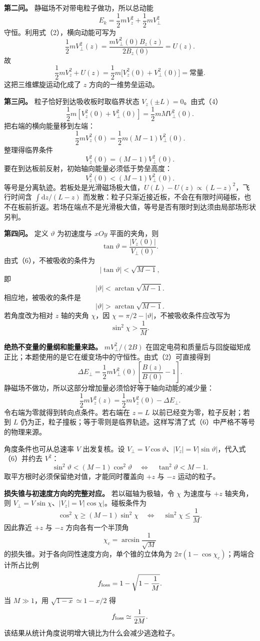\documentclass[12pt,a4paper,UTF8]{ctexart}
\begin{document}
\textbf{第二问。} 静磁场不对带电粒子做功，所以总动能 \[
E_k=\frac12mV_z^2+\frac12mV_\perp^2
\] 守恒。利用式（2），横向动能可写为 \[
\frac12mV_\perp^2(z)
=\frac{mV_\perp^2(0)B_z(z)}{2B_z(0)}
=U(z). \tag{3}
\] 故 \[
\boxed{
\frac12mV_z^2+U(z)
=\frac12m\bigl[V_z^2(0)+V_\perp^2(0)\bigr]
=\text{常量}
}. \tag{4}
\] 这把三维螺旋运动化成了 \(z\) 方向的一维势垒运动。

\textbf{第三问。} 粒子恰好到达吸收板时取临界状态
\(V_z(\pm L)=0\)。由式（4） \[
\frac12m\left[V_z^2(0)+V_\perp^2(0)\right]
=\frac12mM V_\perp^2(0).
\] 把右端的横向能量移到左端： \[
\frac12mV_z^2(0)
=\frac12m(M-1)V_\perp^2(0).
\] 整理得临界条件 \[
V_z^2(0)=(M-1)V_\perp^2(0). \tag{5}
\] 要在到达板前反射，初始轴向能量必须低于势垒高度： \[
\boxed{
V_z^2(0)<(M-1)V_\perp^2(0)
}. \tag{6}
\]
等号是分离轨迹。若板处是光滑磁场极大值，\(U(L)-U(z)\propto(L-z)^2\)，飞行时间含
\(\int \mathrm dz/(L-z)\)
而发散：粒子只渐近接近板，不会在有限时间碰板，也不在板前折返。若场在端点不是光滑极大值，等号是否有限时到达须由局部场形状另判。

\textbf{第四问。} 定义 \(\vartheta\) 为初速度与 \(xOy\) 平面的夹角，则
\[
\tan\vartheta=\frac{|V_z(0)|}{V_\perp(0)}. \tag{7}
\] 由式（6），不被吸收的条件为 \[
|\tan\vartheta|<\sqrt{M-1},
\] 即 \[
\boxed{
|\vartheta|<\arctan\sqrt{M-1}
}. \tag{8}
\] 相应地，被吸收的条件是 \[
\boxed{
|\vartheta|>\arctan\sqrt{M-1}
}. \tag{9}
\] 若角度改为相对 \(z\) 轴的夹角 \(\chi\)，因
\(\chi=\pi/2-|\vartheta|\)，不被吸收条件应改写为 \[
\sin^2\chi>\frac1M.
\]

\textbf{绝热不变量的量纲和能量来路。} \(mV_\perp^2/(2B)\)
在固定电荷和质量后与回旋磁矩成正比；本题使用的是它在缓变场中的守恒性。由式（2）可直接得到
\[
\Delta E_\perp
=\frac12mV_\perp^2(0)
\left[\frac{B(z)}{B(0)}-1\right].
\] 静磁场不做功，所以这部分增加量必须恰好等于轴向动能的减少量： \[
\frac12mV_z^2(z)
=\frac12mV_z^2(0)-\Delta E_\perp.
\] 令右端为零就得到转向点条件。若右端在 \(z=L\)
以前已经变为零，粒子反射；若到 \(L\)
仍为正，粒子撞板；等于零则是临界轨迹。这样写清了式（6）中严格不等号的物理来源。

角度条件也可从总速率 \(V\) 出发复核。设
\(V_\perp=V\cos\vartheta\)、\(|V_z|=V|\sin\vartheta|\)，代入式（6）并约去
\(V^2\)： \[
\sin^2\vartheta<(M-1)\cos^2\vartheta
\quad\Longleftrightarrow\quad
\tan^2\vartheta<M-1.
\] 取平方根时必须保留绝对值，才能同时覆盖向 \(+z\) 与 \(-z\)
运动的粒子。

\textbf{损失锥与初速度方向的完整对应。} 若以磁轴为极轴，令 \(\chi\)
为速度与 \(+z\) 轴夹角，则
\(V_\perp=V\sin\chi\)、\(|V_z|=V|\cos\chi|\)。碰板条件为 \[
\cos^2\chi\ge(M-1)\sin^2\chi
\quad\Longleftrightarrow\quad
\sin^2\chi\le\frac1M.
\] 因此靠近 \(+z\) 与 \(-z\) 方向各有一个半顶角 \[
\chi_c=\arcsin\frac1{\sqrt M}
\] 的损失锥。对于各向同性速度方向，单个锥的立体角为
\(2\pi(1-\cos\chi_c)\)；两端合计所占比例 \[
f_{\rm loss}
=1-\sqrt{1-\frac1M}.
\] 当 \(M\gg1\)，用 \(\sqrt{1-x}\simeq1-x/2\) 得 \[
f_{\rm loss}\simeq\frac1{2M}.
\] 该结果从统计角度说明增大镜比为什么会减少逃逸粒子。
\end{document}

